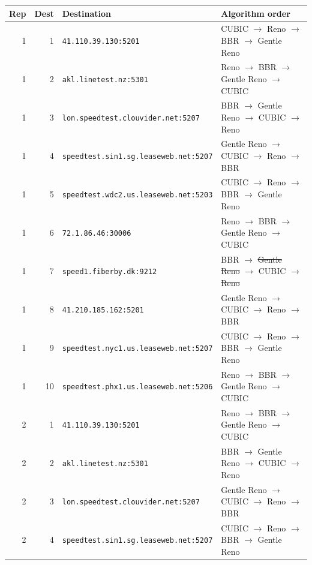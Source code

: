 \begin{longtable}{rrll}
\toprule
Rep & Dest & Destination & Algorithm order \\
\midrule
\endhead
1 & 1 & \texttt{41.\allowbreak{}110.\allowbreak{}39.\allowbreak{}130:5201} & CUBIC $\to$ Reno $\to$ BBR $\to$ Gentle Reno \\
1 & 2 & \texttt{akl.\allowbreak{}linetest.\allowbreak{}nz:5301} & Reno $\to$ BBR $\to$ Gentle Reno $\to$ CUBIC \\
1 & 3 & \texttt{lon.\allowbreak{}speedtest.\allowbreak{}clouvider.\allowbreak{}net:5207} & BBR $\to$ Gentle Reno $\to$ CUBIC $\to$ Reno \\
1 & 4 & \texttt{speedtest.\allowbreak{}sin1.\allowbreak{}sg.\allowbreak{}leaseweb.\allowbreak{}net:5207} & Gentle Reno $\to$ CUBIC $\to$ Reno $\to$ BBR \\
1 & 5 & \texttt{speedtest.\allowbreak{}wdc2.\allowbreak{}us.\allowbreak{}leaseweb.\allowbreak{}net:5203} & CUBIC $\to$ Reno $\to$ BBR $\to$ Gentle Reno \\
1 & 6 & \texttt{72.\allowbreak{}1.\allowbreak{}86.\allowbreak{}46:30006} & Reno $\to$ BBR $\to$ Gentle Reno $\to$ CUBIC \\
1 & 7 & \texttt{speed1.\allowbreak{}fiberby.\allowbreak{}dk:9212} & BBR $\to$ \sout{Gentle Reno} $\to$ CUBIC $\to$ \sout{Reno} \\
1 & 8 & \texttt{41.\allowbreak{}210.\allowbreak{}185.\allowbreak{}162:5201} & Gentle Reno $\to$ CUBIC $\to$ Reno $\to$ BBR \\
1 & 9 & \texttt{speedtest.\allowbreak{}nyc1.\allowbreak{}us.\allowbreak{}leaseweb.\allowbreak{}net:5207} & CUBIC $\to$ Reno $\to$ BBR $\to$ Gentle Reno \\
1 & 10 & \texttt{speedtest.\allowbreak{}phx1.\allowbreak{}us.\allowbreak{}leaseweb.\allowbreak{}net:5206} & Reno $\to$ BBR $\to$ Gentle Reno $\to$ CUBIC \\
2 & 1 & \texttt{41.\allowbreak{}110.\allowbreak{}39.\allowbreak{}130:5201} & Reno $\to$ BBR $\to$ Gentle Reno $\to$ CUBIC \\
2 & 2 & \texttt{akl.\allowbreak{}linetest.\allowbreak{}nz:5301} & BBR $\to$ Gentle Reno $\to$ CUBIC $\to$ Reno \\
2 & 3 & \texttt{lon.\allowbreak{}speedtest.\allowbreak{}clouvider.\allowbreak{}net:5207} & Gentle Reno $\to$ CUBIC $\to$ Reno $\to$ BBR \\
2 & 4 & \texttt{speedtest.\allowbreak{}sin1.\allowbreak{}sg.\allowbreak{}leaseweb.\allowbreak{}net:5207} & CUBIC $\to$ Reno $\to$ BBR $\to$ Gentle Reno \\

\end{longtable}
